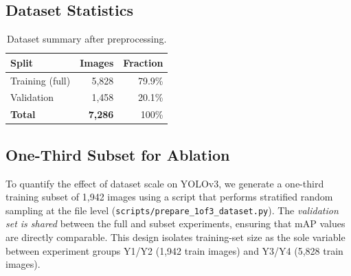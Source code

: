 \subsection{Dataset Statistics}

\begin{table}[H]
\centering
\caption{Dataset summary after preprocessing.}
\label{tab:dataset}
\begin{tabular}{lrr}
\toprule
\textbf{Split} & \textbf{Images} & \textbf{Fraction} \\
\midrule
Training (full) & 5{,}828 & 79.9\% \\
Validation      & 1{,}458 & 20.1\% \\
\midrule
\textbf{Total}  & \textbf{7{,}286} & 100\% \\
\bottomrule
\end{tabular}
\end{table}

\subsection{One-Third Subset for Ablation}
\label{sec:dataset:subset}

To quantify the effect of dataset scale on YOLOv3, we generate a
one-third training subset of 1,942 images using a script that performs
stratified random sampling at the file level
(\texttt{scripts/prepare\_1of3\_dataset.py}).
The \emph{validation set is shared} between the full and subset
experiments, ensuring that mAP values are directly comparable.
This design isolates training-set size as the sole variable between
experiment groups Y1/Y2 (1,942 train images) and Y3/Y4 (5,828 train images).

